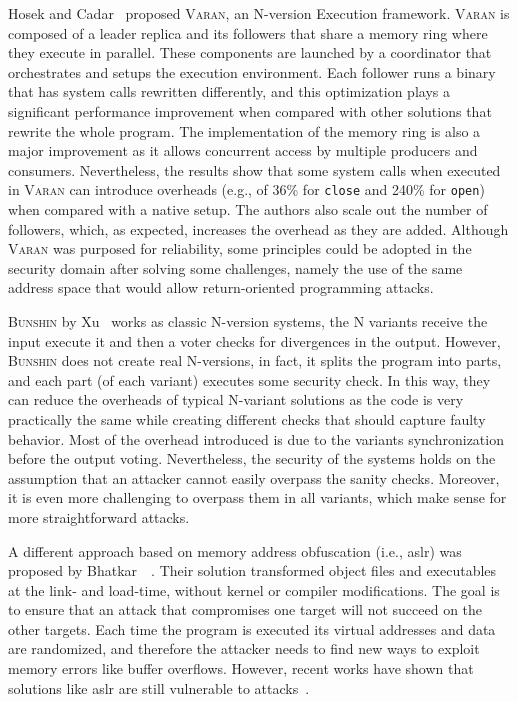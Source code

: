 Hosek and Cadar~\cite{Hosek:2015} proposed \textsc{Varan}, an N-version Execution framework.
\textsc{Varan} is composed of a leader replica and its followers that share a memory ring where they execute in parallel.
These components are launched by a coordinator that orchestrates and setups the execution environment.
Each follower runs a binary that has system calls rewritten differently, and this optimization plays a significant performance improvement when compared with other solutions that rewrite the whole program.
The implementation of the memory ring is also a major improvement as it allows concurrent access by multiple producers and consumers.
Nevertheless, the results show that some system calls when executed in \textsc{Varan} can introduce overheads (e.g., of 36\% for \texttt{close} and 240\% for \texttt{open}) when compared with a native setup.
The authors also scale out the number of followers, which, as expected, increases the overhead as they are added. 
Although \textsc{Varan} was purposed for reliability, some principles could be adopted in the security domain after solving some challenges, namely the use of the same address space that would allow return-oriented programming attacks.

\textsc{Bunshin} by Xu~\etal{} works as classic N-version systems, the N variants receive the input execute it and then a voter checks for divergences in the output.
However, \textsc{Bunshin} does not create real N-versions, in fact, it splits the program into parts, and each part (of each variant) executes some security check. 
In this way, they can reduce the overheads of typical N-variant solutions as the code is very practically the same while creating different checks that should capture faulty behavior.
Most of the overhead introduced is due to the variants synchronization before the output voting.
Nevertheless, the security of the systems holds on the assumption that an attacker cannot easily overpass the sanity checks.
Moreover, it is even more challenging to overpass them in all variants, which make sense for more straightforward attacks.


A different approach based on memory address obfuscation (i.e., \gls{aslr}) was proposed by Bhatkar~\etal{}~\cite{Bhatkar:2003}.
Their solution transformed object files and executables at the link- and load-time, without kernel or compiler modifications. 
The goal is to ensure that an attack that compromises one target will not succeed on the other targets. 
Each time the program is executed its virtual addresses and data are randomized, and therefore the attacker needs to find new ways to exploit memory errors like buffer overflows. 
However, recent works have shown that solutions like \gls{aslr} are still vulnerable to attacks~\cite{Bittau:2014,Jang:2016,Snow:2013,vanderVeen:2017}.

